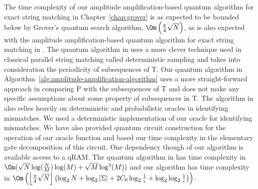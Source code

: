 The time complexity of our amplitude amplification-based quantum algorithm for exact string matching in Chapter~\ref{chap:grover} is as expected to be bounded below by Grover's quantum search algorithm, $\Om\left( \frac{\pi}{4}\sqrt{N} \right)$, as is also expected with the amplitude amplification-based quantum algorithm for exact string matching in \cite{Ramesh2003}. The quantum algorithm in \cite{Ramesh2003} uses a more clever technique used in classical parallel string matching called deterministic sampling and takes into consideration the periodicity of subsequences of T. Our quantum algorithm in Algorithm~\ref{alg:amplitude-amplification-algorithm} uses a more straight-forward approach in comparing P with the subsequences of T and does not make any specific assumptions about some property of subsequences in T. The algorithm in \cite{Ramesh2003} also relies heavily on deterministic and probabilistic oracles in identifying mismatches. We used a deterministic implementation of our oracle for identifying mismatches. We have also provided quantum circuit construction for the operation of our oracle function and based our time complexity in the elementary gate decomposition of this circuit. One dependency though of our algorithm is available access to a qRAM. The quantum algorithm in \cite{Ramesh2003} has time complexity in $\Om(\sqrt{N}\log(\frac{N}{M})\log(M) + \sqrt{M}\log^2(M))$ and our algorithm has time complexity in $\Om\left( \left\lfloor \frac{\pi}{4}\sqrt{N} \right\rfloor \left( \log_2 N + \log_2 \vert \Sigma \vert + 2C_0\log_2\frac{1}{\epsilon} + \log_2\log_2\frac{1}{\epsilon} \right) \right)$.

